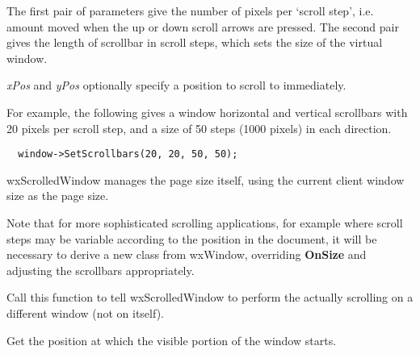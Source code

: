 



The first pair of parameters give the number of pixels per `scroll step', i.e. amount
moved when the up or down scroll arrows are pressed.
The second pair gives the length of scrollbar in scroll steps, which sets the size of the virtual
window.

{\it xPos} and {\it yPos} optionally specify a position to scroll to immediately.

For example, the following gives a window horizontal and vertical
scrollbars with 20 pixels per scroll step, and a size of 50 steps (1000
pixels) in each direction.

\begin{verbatim}
  window->SetScrollbars(20, 20, 50, 50);
\end{verbatim}

wxScrolledWindow manages the page size itself,
using the current client window size as the page size.

Note that for more sophisticated scrolling applications, for example where
scroll steps may be variable according to the position in the document, it will be
necessary to derive a new class from wxWindow, overriding {\bf OnSize} and
adjusting the scrollbars appropriately.

\label{wxscrolledwindowsettargetwindow}


Call this function to tell wxScrolledWindow to perform the actually scrolling on
a different window (not on itself).

\label{wxscrolledwindowgetviewstart}


Get the position at which the visible portion of the window starts.



